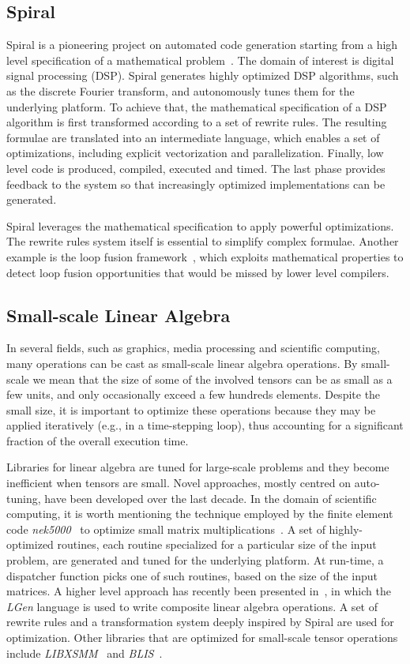 \subsection{Spiral}
Spiral is a pioneering project on automated code generation starting from a high level specification of a mathematical problem~\citep{Pueschel:05}. The domain of interest is digital signal processing (DSP). Spiral generates highly optimized DSP algorithms, such as the discrete Fourier transform, and autonomously tunes them for the underlying platform. To achieve that, the mathematical specification of a DSP algorithm is first transformed according to a set of rewrite rules. The resulting formulae are translated into an intermediate language, which enables a set of optimizations, including explicit vectorization and parallelization. Finally, low level code is produced, compiled, executed and timed. The last phase provides feedback to the system so that increasingly optimized implementations can be generated. 

Spiral leverages the mathematical specification to apply powerful optimizations. The rewrite rules system itself is essential to simplify complex formulae. Another example is the loop fusion framework~\citep{spiral-fusion}, which exploits mathematical properties to detect loop fusion opportunities that would be missed by lower level compilers.


\subsection{Small-scale Linear Algebra}
In several fields, such as graphics, media processing and scientific computing, many operations can be cast as small-scale linear algebra operations. By small-scale we mean that the size of some of the involved tensors can be as small as a few units, and only occasionally exceed a few hundreds elements. Despite the small size, it is important to optimize these operations because they may be applied iteratively (e.g., in a time-stepping loop), thus accounting for a significant fraction of the overall execution time. 

Libraries for linear algebra are tuned for large-scale problems and they become inefficient when tensors are small. Novel approaches, mostly centred on auto-tuning, have been developed over the last decade. In the domain of scientific computing, it is worth mentioning the technique employed by the finite element code {\em nek5000}~\citep{nek5000-web-page} to optimize small matrix multiplications~\citep{nek5000}. A set of highly-optimized routines, each routine specialized for a particular size of the input problem, are generated and tuned for the underlying platform. At run-time, a dispatcher function picks one of such routines, based on the size of the input matrices. A higher level approach has recently been presented in~\cite{Spampinato:14}, in which the {\em LGen} language is used to write composite linear algebra operations. A set of rewrite rules and a transformation system deeply inspired by Spiral are used for optimization. Other libraries that are optimized for small-scale tensor operations include {\em LIBXSMM}~\citep{libxsmm} and {\em BLIS}~\citep{blis}.

